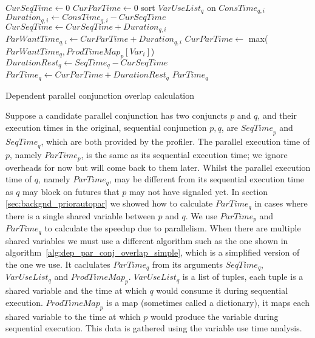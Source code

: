 \begin{algorithm}
\begin{algorithmic}[5]
\State $CurSeqTime \gets 0$
\State $CurParTime \gets 0$
\State sort $VarUseList_q$ on $ConsTime_{q, i}$
    \State $Duration_{q, i} \gets ConsTime_{q, i} - CurSeqTime$
    \State $CurSeqTime \gets CurSeqTime + Duration_{q, i}$
    \State $ParWantTime_{q, i} \gets CurParTime + Duration_{q, i}$
    \State $CurParTime \gets$ max($ParWantTime_q, ProdTimeMap_{p}[Var_i]$)
\EndFor
\State $DurationRest_q \gets SeqTime_q - CurSeqTime$
\State $ParTime_q \gets CurParTime + DurationRest_q$
\State \Return $ParTime_q$
\EndProcedure
\end{algorithmic}
\caption{Dependent parallel conjunction overlap calculation}
\label{alg:dep_par_conj_overlap_simple}
\end{algorithm}

Suppose a candidate parallel conjunction has two conjuncts $p$ and $q$,
and their execution times in the original, sequential conjunction $p, q$,
are ${SeqTime}_p$ and ${SeqTime}_q$, which are both provided by the profiler.
The parallel execution time of $p$, namely $ParTime_p$,
is the same as its sequential execution time;
we ignore overheads for now but will come back to them later.
Whilst the parallel execution time of $q$, namely $ParTime_q$, may be
different from its sequential execution time as $q$ may block on futures
that $p$ may not have signaled yet.
In section \ref{sec:backgnd_priorautopar} we showed how to calculate
$ParTime_q$ in cases where there is a single shared variable between $p$ and
$q$.
We use $ParTime_p$ and $ParTime_q$ to calculate the speedup due to
parallelism.
When there are multiple shared variables we must use a different algorithm
such as the one shown in algorithm~\ref{alg:dep_par_conj_overlap_simple},
which is a simplified version of the one we use.
It caclulates $ParTime_q$ from its arguments $SeqTime_q$, $VarUseList_q$ and
$ProdTimeMap_p$.
$VarUseList_q$ is a list of tuples,
each tuple is a shared variable and the time at which $q$ would consume it
during sequential execution.
$ProdTimeMap_p$ is a map (sometimes called a dictionary),
it maps each shared variable to the time at which $p$ would produce the
variable during sequential execution.
This data is gathered using the variable use time analysis.

